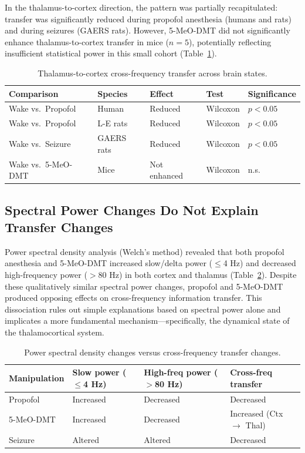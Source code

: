 \documentclass[12pt]{article}
\begin{document}
In the thalamus-to-cortex direction, the pattern was partially recapitulated: transfer was significantly reduced during propofol anesthesia (humans and rats) and during seizures (GAERS rats). However, 5-MeO-DMT did not significantly enhance thalamus-to-cortex transfer in mice ($n = 5$), potentially reflecting insufficient statistical power in this small cohort (Table~\ref{tab:thal_ctx}).

\begin{table}[H]
\centering
\caption{Thalamus-to-cortex cross-frequency transfer across brain states.}
\label{tab:thal_ctx}
\begin{tabular}{lllll}
\toprule
Comparison & Species & Effect & Test & Significance \\
\midrule
Wake vs.\ Propofol & Human & Reduced & Wilcoxon & $p < 0.05$ \\
Wake vs.\ Propofol & L-E rats & Reduced & Wilcoxon & $p < 0.05$ \\
Wake vs.\ Seizure & GAERS rats & Reduced & Wilcoxon & $p < 0.05$ \\
Wake vs.\ 5-MeO-DMT & Mice & Not enhanced & Wilcoxon & n.s. \\
\bottomrule
\end{tabular}
\end{table}

\subsection{Spectral Power Changes Do Not Explain Transfer Changes}

Power spectral density analysis (Welch's method) revealed that both propofol anesthesia and 5-MeO-DMT increased slow/delta power ($\leq$4 Hz) and decreased high-frequency power ($>$80 Hz) in both cortex and thalamus (Table~\ref{tab:psd}). Despite these qualitatively similar spectral power changes, propofol and 5-MeO-DMT produced opposing effects on cross-frequency information transfer. This dissociation rules out simple explanations based on spectral power alone and implicates a more fundamental mechanism---specifically, the dynamical state of the thalamocortical system.

\begin{table}[H]
\centering
\caption{Power spectral density changes versus cross-frequency transfer changes.}
\label{tab:psd}
\begin{tabular}{llll}
\toprule
Manipulation & Slow power ($\leq$4 Hz) & High-freq power ($>$80 Hz) & Cross-freq transfer \\
\midrule
Propofol & Increased & Decreased & Decreased \\
5-MeO-DMT & Increased & Decreased & Increased (Ctx $\to$ Thal) \\
Seizure & Altered & Altered & Decreased \\
\bottomrule
\end{tabular}
\end{table}
\end{document}
